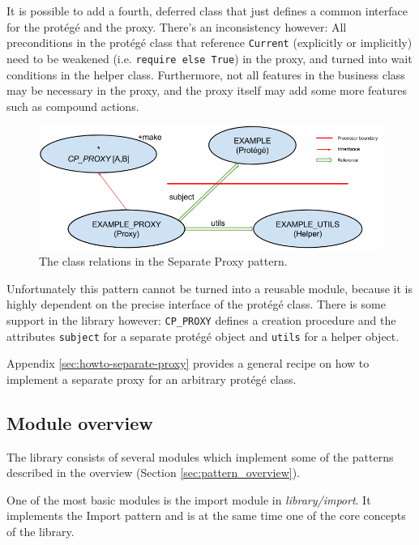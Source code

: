 \documentclass[a4paper,10pt]{article}
\newcommand{\dir}{\emph}
\begin{document}
It is possible to add a fourth, deferred class that just defines a common interface for the protégé and the proxy.
There's an inconsistency however: 
All preconditions in the protégé class that reference \lstinline!Current! (explicitly or implicitly) need to be weakened (i.e. \lstinline!require else True!) in the proxy, and turned into wait conditions in the helper class.
Furthermore, not all features in the business class may be necessary in the proxy, and the proxy itself may add some more features such as compound actions.

\begin{figure}[h]
\label{fig:separate-proxy}
\includegraphics[width=\textwidth]{separate_proxy.png}
\caption{The class relations in the Separate Proxy pattern.}
\end{figure}

Unfortunately this pattern cannot be turned into a reusable module, because it is highly dependent on the precise interface of the protégé class.
There is some support in the library however: 
\lstinline!CP_PROXY! defines a creation procedure and the attributes \lstinline!subject! for a separate protégé object and \lstinline!utils! for a helper object.

Appendix \ref{sec:howto-separate-proxy} provides a general recipe on how to implement a separate proxy for an arbitrary protégé class.

\subsection {Module overview}
\label{sec:module-overview}

The library consists of several modules which implement some of the patterns described in the overview (Section \ref{sec:pattern_overview}).

One of the most basic modules is the import module in \dir{library/import}.
It implements the Import  pattern  and is at the same time one of the core concepts of the library.
\end{document}
